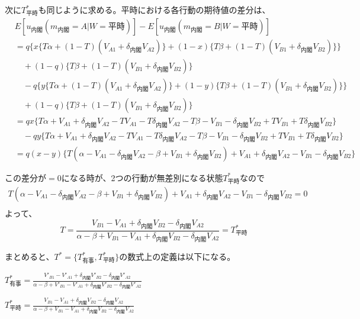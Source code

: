 \documentclass[main.tex]{subfiles}
\begin{document}
次に$T^*_{平時}$も同じように求める。平時における各行動の期待値の差分は、
\begin{align*}
    & E[u_{内閣}(m_{内閣}=A|W=平時)] - E[u_{内閣}(m_{内閣}=B|W=平時)]\\
    & = q\Big\lbrace
        x \lbrace T\alpha + (1-T)(V_{A1} + \delta_{内閣} V_{A2}) \rbrace + (1-x)\lbrace T\beta + (1-T)(V_{B1} + \delta_{内閣} V_{B2}) \rbrace 
        \Big\rbrace\\
    & \quad +(1-q)\lbrace T\beta + (1-T)(V_{B1} + \delta_{内閣} V_{B2}) \rbrace\\
    & \quad - q\Big\lbrace
        y \lbrace T\alpha + (1-T)(V_{A1} + \delta_{内閣} V_{A2}) \rbrace + (1-y)\lbrace T\beta + (1-T)(V_{B1} + \delta_{内閣} V_{B2}) \rbrace
        \Big\rbrace\\
    & \quad +(1-q)\lbrace T\beta + (1-T)(V_{B1} + \delta_{内閣} V_{B2}) \rbrace\\
    & = qx \lbrace T\alpha + V_{A1} + \delta_{内閣}V_{A2} - TV_{A1} - T\delta_{内閣}V_{A2} - T\beta -V_{B1} -\delta_{内閣}V_{B2} + TV_{B1} + T\delta_{内閣}V_{B2} \rbrace\\
    & \quad -qy\lbrace T\alpha + V_{A1} + \delta_{内閣}V_{A2} - TV_{A1} - T\delta_{内閣}V_{A2} - T\beta -V_{B1} -\delta_{内閣}V_{B2} + TV_{B1} + T\delta_{内閣}V_{B2} \rbrace\\
    & = q(x-y)\lbrace T(\alpha -V_{A1} -\delta_{内閣}V_{A2} - \beta + V_{B1} + \delta_{内閣}V_{B2}) + V_{A1} + \delta_{内閣}V_{A2} - V_{B1} - \delta_{内閣}V_{B2}  \rbrace
\end{align*}

\noindent
この差分が$=0$になる時が、2つの行動が無差別になる状態$T^*_{平時}$なので
\begin{gather*}
    T(\alpha -V_{A1} -\delta_{内閣}V_{A2} - \beta + V_{B1} + \delta_{内閣}V_{B2}) + V_{A1} + \delta_{内閣}V_{A2} - V_{B1} - \delta_{内閣}V_{B2} = 0\\
\end{gather*}
よって、
$$T = \frac{ V_{B1} - V_{A1} +\delta_{内閣}V_{B2} - \delta_{内閣}V_{A2} }{ \alpha-\beta + V_{B1}-V_{A1} + \delta_{内閣}V_{B2} - \delta_{内閣}V_{A2} }
= T^*_{平時}$$


まとめると、$T^* = \lbrace T^*_{有事}, T^*_{平時} \rbrace$の数式上の定義は以下になる。
\begin{definition} $T^*_{有事} = \frac{ V'_{B1} - V'_{A1} +\delta_{内閣}V'_{B2} - \delta_{内閣}V'_{A2} }{ \alpha-\beta + V'_{B1}-V'_{A1} + \delta_{内閣}V'_{B2} - \delta_{内閣}V'_{A2} }$ \end{definition}
\begin{definition} $T^*_{平時} = \frac{ V_{B1} - V_{A1} +\delta_{内閣}V_{B2} - \delta_{内閣}V_{A2} }{ \alpha-\beta + V_{B1}-V_{A1} + \delta_{内閣}V_{B2} - \delta_{内閣}V_{A2} }$ \end{definition}
\end{document}
